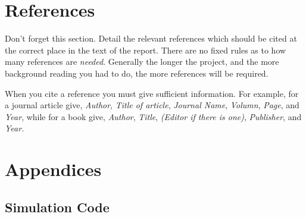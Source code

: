 \documentclass[a4paper,12pt]{article}
\begin{document}
\section{References}

Don't forget this section. Detail the relevant references which
should be cited at the correct place in the text of the report. There
are no fixed rules as to how many references are {\it needed}. Generally
the longer the project, and the more background reading you had to do,
the more references will be required. 

When you cite a reference you must give sufficient information. For
example, for a journal article give, {\it Author}, {\it Title of
article},
{\it Journal Name}, {\it Volumn}, {\it Page}, and {\it Year}, 
while for a book give, {\it Author}, {\it Title},
{\it (Editor if there is one)}, {\it Publisher}, and {\it Year}.        

   



\appendix
\section{Appendices}

%

\subsection{Simulation Code}
\end{document}
